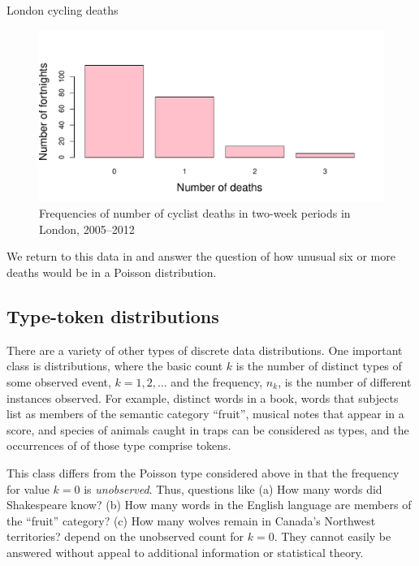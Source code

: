 \documentclass[10pt,krantz2]{krantz}\usepackage[]{graphicx}\usepackage[]{color}
\newenvironment{knitrout}{}{} %
\renewenvironment{knitrout}{\small\renewcommand{\baselinestretch}{.85}}{} %
\begin{document}
\begin{Example}[cyclists1]{London cycling deaths}
\begin{knitrout}
\begin{figure}[!htbp]
\centerline{\includegraphics[width=.75\textwidth]{ch03/fig/cyclists2-1} }

\caption[Frequencies of number of cyclist deaths in two-week periods in London, 2005--2012]{Frequencies of number of cyclist deaths in two-week periods in London, 2005--2012\label{fig:cyclists2}}
\end{figure}


\end{knitrout}
We return to this data in  and answer the question of
how unusual six or more deaths would be in a Poisson distribution.

\end{Example}

\subsection{Type-token distributions}\label{sec:type-token}

There are a variety of other types of discrete data distributions.
One important class is  distributions, where
the basic count $k$ is the number of distinct types of some observed
event, $k = 1, 2, \dots$ and the frequency, $n_k$, is the number of
different instances observed.  For example, distinct words in a book,
words that subjects list as members of the semantic category ``fruit'',
musical notes that appear in a score, and species of animals caught
in traps can be considered as types, and the occurrences of
of those type comprise tokens.

This class differs from the Poisson type considered above
in that the frequency for value $k=0$ is \emph{unobserved}.  Thus, questions like
(a) How many words did Shakespeare know?
(b) How many words in the English language are members of the
``fruit'' category?
(c) How many wolves remain in Canada's Northwest territories?
depend on the unobserved count for $k=0$. They
cannot easily be answered without appeal to additional information
or statistical theory.
\end{document}
